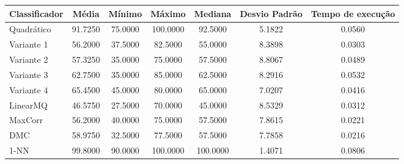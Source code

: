 \documentclass[12pt]{article}
\begin{document}
	\begin{tabular}{lcccccc}
		\hline
		Classificador & Média & Mínimo & Máximo & Mediana & Desvio Padrão & Tempo de execução \\
		\hline
		Quadrático &   91.7250 &  75.0000 & 100.0000 &  92.5000 &   5.1822 &    0.0560 \\
		Variante 1 &   56.2000 &  37.5000 &  82.5000 &  55.0000 &   8.3898 &    0.0303 \\
		Variante 2 &   57.3250 &  35.0000 &  75.0000 &  57.5000 &   8.8067 &    0.0489 \\
		Variante 3 &   62.7500 &  35.0000 &  85.0000 &  62.5000 &   8.2916 &    0.0532 \\
		Variante 4 &   65.4500 &  45.0000 &  80.0000 &  65.0000 &   7.0207 &    0.0416 \\
		LinearMQ   &   46.5750 &  27.5000 &  70.0000 &  45.0000 &   8.5329 &    0.0312 \\
		MaxCorr    &   56.2000 &  40.0000 &  75.0000 &  57.5000 &   7.8615 &    0.0221 \\
		DMC        &   58.9750 &  32.5000 &  77.5000 &  57.5000 &   7.7858 &    0.0216 \\
		1-NN       &   99.8000 &  90.0000 & 100.0000 & 100.0000 &   1.4071 &    0.0806 \\
		\hline
	\end{tabular}
	
	\hfill
	
\end{document}
